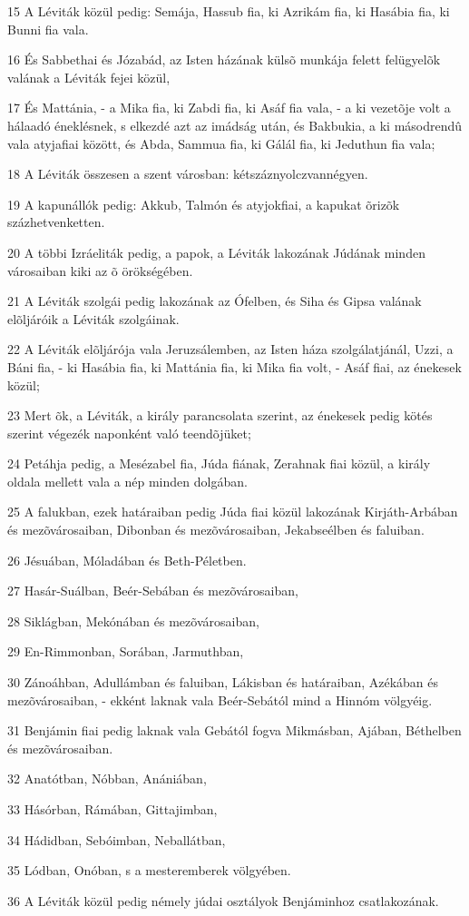 \par 15 A Léviták közül pedig: Semája, Hassub fia, ki Azrikám fia, ki Hasábia fia, ki Bunni fia vala.
\par 16 És Sabbethai és Józabád, az Isten házának külsõ munkája felett felügyelõk valának a Léviták fejei közül,
\par 17 És Mattánia, - a Mika fia, ki Zabdi fia, ki Asáf fia vala, - a ki vezetõje volt a hálaadó éneklésnek, s elkezdé azt az imádság után, és Bakbukia, a ki másodrendû vala atyjafiai között, és Abda, Sammua fia, ki Gálál fia, ki Jeduthun fia vala;
\par 18 A Léviták összesen a szent városban: kétszáznyolczvannégyen.
\par 19 A kapunállók pedig: Akkub, Talmón és atyjokfiai, a kapukat õrizõk százhetvenketten.
\par 20 A többi Izráeliták pedig, a papok, a Léviták lakozának Júdának minden városaiban kiki az õ örökségében.
\par 21 A Léviták szolgái pedig lakozának az Ófelben, és Siha és Gipsa valának elõljáróik a Léviták szolgáinak.
\par 22 A Léviták elõljárója vala Jeruzsálemben, az Isten háza szolgálatjánál, Uzzi, a Báni fia, - ki Hasábia fia, ki Mattánia fia, ki Mika fia volt, - Asáf fiai, az énekesek közül;
\par 23 Mert õk, a Léviták, a király parancsolata szerint, az énekesek pedig kötés szerint végezék naponként való teendõjüket;
\par 24 Petáhja pedig, a Mesézabel fia, Júda fiának, Zerahnak fiai közül, a király oldala mellett vala a nép minden dolgában.
\par 25 A falukban, ezek határaiban pedig Júda fiai közül lakozának Kirjáth-Arbában és mezõvárosaiban, Dibonban és mezõvárosaiban, Jekabseélben és faluiban.
\par 26 Jésuában, Móladában és Beth-Péletben.
\par 27 Hasár-Suálban, Beér-Sebában és mezõvárosaiban,
\par 28 Siklágban, Mekónában és mezõvárosaiban,
\par 29 En-Rimmonban, Sorában, Jarmuthban,
\par 30 Zánoáhban, Adullámban és faluiban, Lákisban és határaiban, Azékában és mezõvárosaiban, - ekként laknak vala Beér-Sebától mind a Hinnóm völgyéig.
\par 31 Benjámin fiai pedig laknak vala Gebától fogva Mikmásban, Ajában, Béthelben és mezõvárosaiban.
\par 32 Anatótban, Nóbban, Anániában,
\par 33 Hásórban, Rámában, Gittajimban,
\par 34 Hádidban, Sebóimban, Neballátban,
\par 35 Lódban, Onóban, s a mesteremberek völgyében.
\par 36 A Léviták közül pedig némely júdai osztályok Benjáminhoz csatlakozának.

